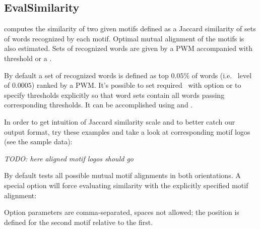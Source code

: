 \subsection{EvalSimilarity}
 computes the similarity of two given motifs defined as a Jaccard similarity of sets of words recognized by each motif.
Optimal mutual alignment of the motifs is also estimated. Sets of recognized words are given by a PWM accompanied with threshold or a \pvalue. 

By default a set of recognized words is defined as top $0.05\%$ of words (i.e. \pvalue\ level of $0.0005$) ranked by a PWM.
It's possible to set required \pvalue\ with  option or to specify thresholds explicitly so that word sets contain all words passing corresponding thresholds. It can be accomplished using  and .

In order to get intuition of Jaccard similarity scale and to better catch our output format, try these examples and take a look at corresponding motif logos (see the sample data):

\emph{TODO: here aligned motif logos should go}





By default  tests all possible mutual motif alignments in both orientations. 
A special option  will force evaluating similarity with the explicitly specified motif alignment:


Option parameters are comma-separated, spaces not allowed; the position is defined for the second motif relative to the first.

